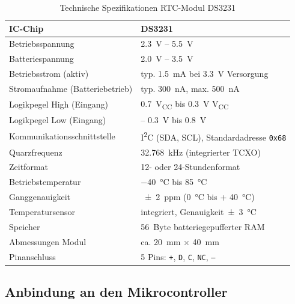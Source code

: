 \begin{table}[H]
	\centering
	\renewcommand{\arraystretch}{1.2}
	\caption{Technische Spezifikationen RTC-Modul DS3231 \cite{MaximIntegrated:2023}}
	\label{tab:ds3231_specs}
	\begin{tabular}{|l|p{8cm}|}
		\hline
		IC-Chip & DS3231 \\ 
		\hline
		Betriebsspannung & \SI{2.3}{V} -- \SI{5.5}{V} \\ 
		\hline
		Batteriespannung & \SI{2.0}{V} -- \SI{3.5}{V} \\ 
		\hline
		Betriebsstrom (aktiv) & typ. \SI{1.5}{mA} bei \SI{3.3}{V} Versorgung \\ 
		\hline
		Stromaufnahme (Batteriebetrieb) & typ. \SI{300}{nA}, max. \SI{500}{nA} \\ 
		\hline
		Logikpegel High (Eingang) & \SI{0.7}{V}\textsubscript{CC} bis \SI{0.3}{V} \text{über} V\textsubscript{CC} \\ 
		\hline
		Logikpegel Low (Eingang) & -- \SI{0.3}{V} bis \SI{0.8}{V} \\ 
		\hline
		Kommunikationsschnittstelle & I\textsuperscript{2}C (SDA, SCL), Standardadresse \texttt{0x68} \\ 
		\hline
		Quarzfrequenz & \SI{32.768}{kHz} (integrierter TCXO) \\ 
		\hline
		Zeitformat & 12- oder 24-Stundenformat \\ 
		\hline
		Betriebstemperatur & \SI{-40}{\degreeCelsius} bis \SI{+85}{\degreeCelsius} \\ 
		\hline
		Ganggenauigkeit & \SI{\pm 2}{ppm} (\SI{0}{\degreeCelsius} bis + \SI{40}{\degreeCelsius}) \\ 
		\hline
		Temperatursensor & integriert, Genauigkeit\SI{\pm 3}{\degreeCelsius} \\ 
		\hline
		Speicher & \SI{56}{Byte} batteriegepufferter RAM \\ 
		\hline
		Abmessungen Modul & ca. \SI{20}{mm} $\times$ \SI{40}{mm} \\ 
		\hline
		Pinanschluss & 5 Pins: \texttt{+}, \texttt{D}, \texttt{C}, \texttt{NC}, \texttt{--} \\ 
		\hline
	\end{tabular}
\end{table}





\subsection{Anbindung an den Mikrocontroller}

